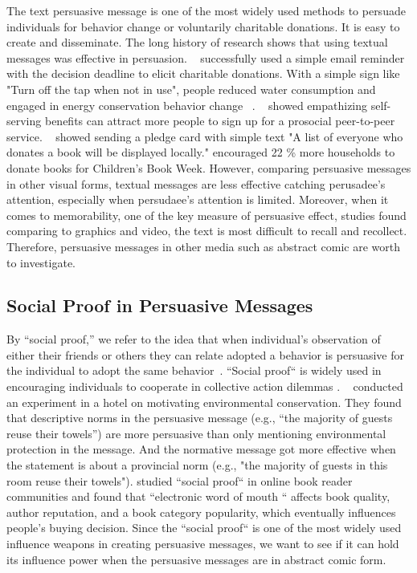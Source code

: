 The text persuasive message is one of the most widely used methods to persuade individuals for behavior change or voluntarily charitable donations. It is easy to create and disseminate. The long history of research shows that using textual messages was effective in persuasion. ~\textcite{damgaard2017now} successfully used a simple email reminder with the decision deadline to elicit charitable donations. With a simple sign like "Turn off the tap when not in use", people reduced water consumption and engaged in energy conservation behavior change ~\cite{mckenzie2011fostering}. ~\textcite{vaish2018s} showed empathizing self-serving benefits can attract more people to sign up for a prosocial peer-to-peer service.  ~\textcite{cotterill2010impact} showed sending a pledge card with simple text "A list of everyone who donates a book will be displayed locally." encouraged 22 \% more households to donate books for Children's Book Week. However, comparing persuasive messages in other visual forms, textual messages are less effective catching perusadee's attention, especially when persudaee's attention is limited. Moreover, when it comes to memorability, one of the key measure of persuasive effect, studies found comparing to graphics and video, the text is most difficult to recall and recollect. Therefore, persuasive messages in other media such as abstract comic are worth to investigate. 


\subsection{Social Proof in Persuasive Messages }
By ``social proof,'' we refer to the idea that when individual's observation of either their friends or others they can relate adopted a behavior is persuasive for the individual to adopt the same behavior~\cite{Cialdini1993, Cialdini2004}. ``Social proof`` is widely used in encouraging individuals to cooperate in collective action dilemmas \cite{goldstein2008room,schultz2007constructive}. ~\textcite{goldstein2008room} conducted an experiment in a hotel on motivating environmental conservation. They found that descriptive norms in the persuasive message (e.g., ``the majority of guests reuse their towels'') are more persuasive than only mentioning environmental protection in the message. And the normative message got more effective when the statement is about a provincial norm (e.g., "the majority of guests in this room reuse their towels"). \textcite{amblee2011harnessing} studied ``social proof`` in online book reader communities and found that 
``electronic word of mouth `` affects book quality, author  reputation, and a book category popularity, which eventually influences people's buying decision. Since the ``social proof`` is one of the most widely used influence weapons in creating persuasive messages, we want to see if it can hold its influence power when the persuasive messages are in abstract comic form. 


